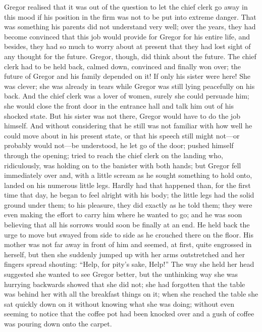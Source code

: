 Gregor realised that it was out of the question to let the chief clerk
go away in this mood if his position in the firm was not to be put into
extreme danger. That was something his parents did not understand very
well; over the years, they had become convinced that this job would
provide for Gregor for his entire life, and besides, they had so much
to worry about at present that they had lost sight of any thought for
the future. Gregor, though, did think about the future. The chief clerk
had to be held back, calmed down, convinced and finally won over; the
future of Gregor and his family depended on it! If only his sister were
here! She was clever; she was already in tears while Gregor was still
lying peacefully on his back. And the chief clerk was a lover of women,
surely she could persuade him; she would close the front door in the
entrance hall and talk him out of his shocked state. But his sister was
not there, Gregor would have to do the job himself. And without
considering that he still was not familiar with how well he could move
about in his present state, or that his speech still might not—or
probably would not—be understood, he let go of the door; pushed himself
through the opening; tried to reach the chief clerk on the landing who,
ridiculously, was holding on to the banister with both hands; but
Gregor fell immediately over and, with a little scream as he sought
something to hold onto, landed on his numerous little legs. Hardly had
that happened than, for the first time that day, he began to feel
alright with his body; the little legs had the solid ground under them;
to his pleasure, they did exactly as he told them; they were even
making the effort to carry him where he wanted to go; and he was soon
believing that all his sorrows would soon be finally at an end. He held
back the urge to move but swayed from side to side as he crouched there
on the floor. His mother was not far away in front of him and seemed,
at first, quite engrossed in herself, but then she suddenly jumped up
with her arms outstretched and her fingers spread shouting: “Help, for
pity’s sake, Help!” The way she held her head suggested she wanted to
see Gregor better, but the unthinking way she was hurrying backwards
showed that she did not; she had forgotten that the table was behind
her with all the breakfast things on it; when she reached the table she
sat quickly down on it without knowing what she was doing; without even
seeming to notice that the coffee pot had been knocked over and a gush
of coffee was pouring down onto the carpet.

